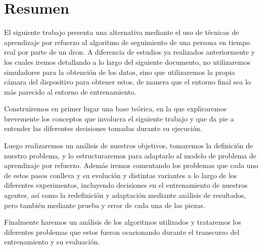 \cleardoublepage

\chapter*{Resumen}
\label{resumen}

El siguiente trabajo presenta una alternativa mediante el uso de técnicas de aprendizaje por refuerzo al algoritmo de seguimiento de una persona en tiempo real por parte de un dron. A diferencia de estudios ya realizados anteriormente y los cuales iremos detallando a lo largo del siguiente documento, no utilizaremos simuladores para la obtención de los datos, sino que utilizaremos la propia cámara del dispositivo para obtener estos, de manera que el entorno final sea lo más parecido al entorno de entrenamiento.
\medskip

Construiremos en primer lugar una base teórica, en la que explicaremos brevemente los conceptos que involucra el siguiente trabajo y que da pie a entender las diferentes decisiones tomadas durante su ejecución.
\medskip

Luego realizaremos un análisis de nuestros objetivos, tomaremos la definición de nuestro problema, y lo estructuraremos para adaptarlo al modelo de problema de aprendizaje por refuerzo. Además iremos comentando los problemas que cada uno de estos pasos conlleva y su evolución y distintas variantes a lo largo de los diferentes experimentos, incluyendo decisiones en el entrenamiento de nuestros agentes, así como la redefinición y adaptación mediante análisis de resultados, pero también mediante prueba y error de cada una de las piezas.
\medskip

Finalmente haremos un análisis de los algoritmos utilizados y trataremos los diferentes problemas que estos fueron ocasionando durante el transcurso del entrenamiento y su evaluación. 

